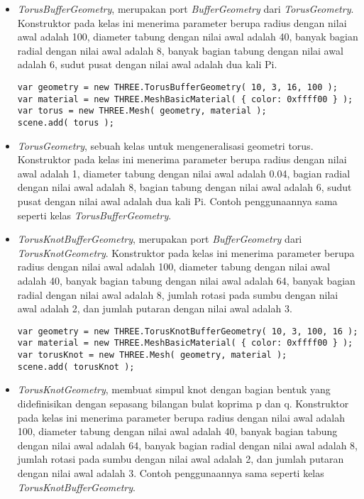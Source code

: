 \begin{itemize}
\begin{itemize}
	\item {\it TorusBufferGeometry}, merupakan port {\it BufferGeometry} dari {\it TorusGeometry}. Konstruktor pada kelas ini menerima parameter berupa radius dengan nilai awal adalah 100, diameter tabung dengan nilai awal adalah 40, banyak bagian radial dengan nilai awal adalah 8, banyak bagian tabung dengan nilai awal adalah 6, sudut pusat dengan nilai awal adalah dua kali Pi. 
	
\begin{lstlisting}[caption={Contoh penggunaan kelas {\it TorusBufferGeometry}.},captionpos=b]
var geometry = new THREE.TorusBufferGeometry( 10, 3, 16, 100 );
var material = new THREE.MeshBasicMaterial( { color: 0xffff00 } );
var torus = new THREE.Mesh( geometry, material );
scene.add( torus );
\end{lstlisting}

	\item {\it TorusGeometry}, sebuah kelas untuk mengeneralisasi geometri torus. Konstruktor pada kelas ini menerima parameter berupa radius dengan nilai awal adalah 1, diameter tabung dengan nilai awal adalah 0.04, bagian radial dengan nilai awal adalah 8, bagian tabung dengan nilai awal adalah 6, sudut pusat dengan nilai awal adalah dua kali Pi.  Contoh penggunaannya sama seperti kelas {\it TorusBufferGeometry}.
	
	\item {\it TorusKnotBufferGeometry}, merupakan port {\it BufferGeometry} dari {\it TorusKnotGeometry}. Konstruktor pada kelas ini menerima parameter berupa radius dengan nilai awal adalah 100, diameter tabung dengan nilai awal adalah 40, banyak bagian tabung dengan nilai awal adalah 64, banyak bagian radial dengan nilai awal adalah 8, jumlah rotasi pada sumbu dengan nilai awal adalah 2, dan jumlah putaran dengan nilai awal adalah 3.
	
\begin{lstlisting}[caption={Contoh penggunaan kelas {\it TorusKnotBufferGeometry}.},captionpos=b]
var geometry = new THREE.TorusKnotBufferGeometry( 10, 3, 100, 16 );
var material = new THREE.MeshBasicMaterial( { color: 0xffff00 } );
var torusKnot = new THREE.Mesh( geometry, material );
scene.add( torusKnot );
\end{lstlisting}

	\item {\it TorusKnotGeometry}, membuat simpul knot dengan bagian bentuk yang didefinisikan dengan sepasang bilangan bulat koprima p dan q. Konstruktor pada kelas ini menerima parameter berupa radius dengan nilai awal adalah 100, diameter tabung dengan nilai awal adalah 40, banyak bagian tabung dengan nilai awal adalah 64, banyak bagian radial dengan nilai awal adalah 8, jumlah rotasi pada sumbu dengan nilai awal adalah 2, dan jumlah putaran dengan nilai awal adalah 3.  Contoh penggunaannya sama seperti kelas {\it TorusKnotBufferGeometry}.
	

\end{itemize}
\end{itemize}
